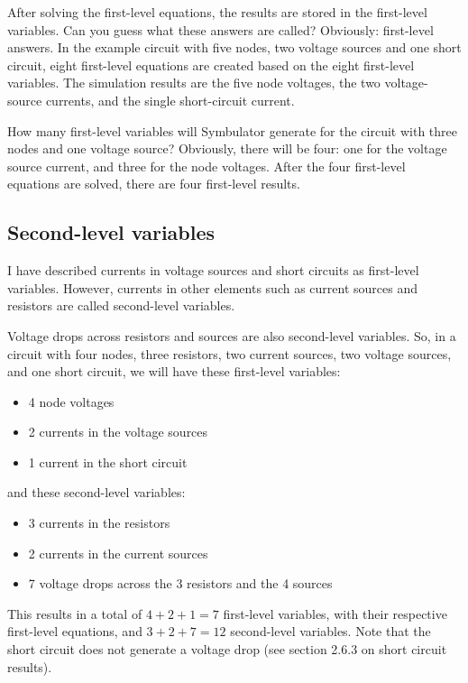 After solving the first-level equations, the results are stored in
the first-level variables. Can you guess what these answers are
called? Obviously: first-level answers. In the example circuit with
five nodes, two voltage sources and one short circuit, eight
first-level equations are created based on the eight first-level
variables. The simulation results are the five node voltages, the
two voltage-source currents, and the single short-circuit current.

How many first-level variables will Symbulator generate for the
circuit with three nodes and one voltage source? Obviously, there
will be four: one for the voltage source current, and three for the
node voltages. After the four first-level equations are solved,
there are four first-level results.

\subsection{Second-level variables}

I have described currents in voltage sources and short circuits as
first-level variables. However, currents in other elements such as
current sources and resistors are called second-level variables.

Voltage drops across resistors and sources are also second-level
variables. So, in a circuit with four nodes, three resistors, two
current sources, two voltage sources, and one short circuit, we will
have these first-level variables:

\begin{itemize}
\item 4 node voltages
\item 2 currents in the voltage sources
\item 1 current in the short circuit
\end{itemize}

and these second-level variables:

\begin{itemize}
\item 3 currents in the resistors
\item 2 currents in the current sources
\item 7 voltage drops across the 3 resistors and the 4 sources
\end{itemize}

This results in a total of $4 + 2 + 1 = 7$ first-level variables,
with their respective first-level equations, and $3 + 2 + 7 = 12$
second-level variables. Note that the short circuit does not
generate a voltage drop (see section 2.6.3 on short circuit
results).

